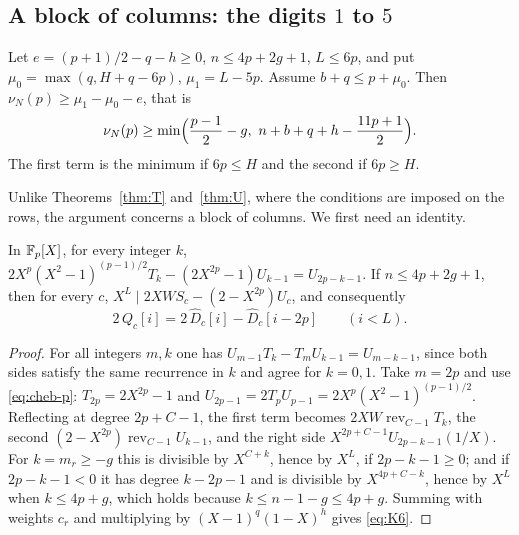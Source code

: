 \subsection{A block of columns: the digits $1$ to $5$}
\begin{theorem}\label{thm:U6}
Let $e=(p+1)/2-q-h\ge0$, $n\le4p+2g+1$, $L\le6p$, and put $\mu_0=\max(q,H+q-6p)$, $\mu_1=L-5p$. Assume
$b+q\le p+\mu_0$. Then $\nu_N(p)\ge\mu_1-\mu_0-e$, that is
\[
 \nu_N(p)\ge\min\Bigl(\frac{p-1}2-g,\ n+b+q+h-\frac{11p+1}2\Bigr).
\]
The first term is the minimum if $6p\le H$ and the second if $6p\ge H$.
\end{theorem}

Unlike Theorems~\ref{thm:T} and~\ref{thm:U}, where the conditions are imposed on the rows, the argument
concerns a block of columns. We first need an identity.

\begin{lemma}\label{lem:K6}
In $\mathbb F_p[X]$, for every integer $k$, $2X^p(X^2-1)^{(p-1)/2}T_k-(2X^{2p}-1)U_{k-1}=U_{2p-k-1}$. If
$n\le4p+2g+1$, then for every $c$, $X^L\mid 2XWS_c-(2-X^{2p})U_c$, and consequently
\begin{equation}\label{eq:K6}
 2\,Q_c[i]=2\,\widehat D_c[i]-\widehat D_c[i-2p]\qquad(i<L).
\end{equation}
\end{lemma}

\begin{proof}
For all integers $m,k$ one has $U_{m-1}T_k-T_mU_{k-1}=U_{m-k-1}$, since both sides satisfy the same
recurrence in $k$ and agree for $k=0,1$. Take $m=2p$ and use \eqref{eq:cheb-p}:
$T_{2p}=2X^{2p}-1$ and $U_{2p-1}=2T_pU_{p-1}=2X^p(X^2-1)^{(p-1)/2}$. Reflecting at degree $2p+C-1$, the first
term becomes $2XW\operatorname{rev}_{C-1}T_k$, the second $(2-X^{2p})\operatorname{rev}_{C-1}U_{k-1}$, and the
right side $X^{2p+C-1}U_{2p-k-1}(1/X)$. For $k=m_r\ge-g$ this is divisible by $X^{C+k}$, hence by $X^L$, if
$2p-k-1\ge0$; and if $2p-k-1<0$ it has degree $k-2p-1$ and is divisible by $X^{4p+C-k}$, hence by $X^L$ when
$k\le4p+g$, which holds because $k\le n-1-g\le4p+g$. Summing with weights $c_r$ and multiplying by
$(X-1)^q(1-X)^h$ gives \eqref{eq:K6}.
\end{proof}

